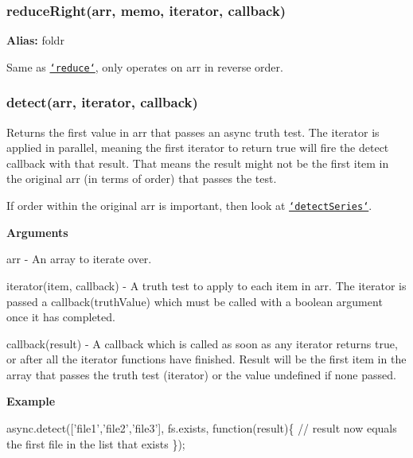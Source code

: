 \label{_reduceRight}%
 \subsubsection*{reduce\+Right(arr, memo, iterator, callback)}

{\bfseries Alias\+:} {\ttfamily foldr}

Same as \href{#reduce}{\tt `reduce`}, only operates on {\ttfamily arr} in reverse order.





\label{_detect}%
 \subsubsection*{detect(arr, iterator, callback)}

Returns the first value in {\ttfamily arr} that passes an async truth test. The {\ttfamily iterator} is applied in parallel, meaning the first iterator to return {\ttfamily true} will fire the detect {\ttfamily callback} with that result. That means the result might not be the first item in the original {\ttfamily arr} (in terms of order) that passes the test.

If order within the original {\ttfamily arr} is important, then look at \href{#detectSeries}{\tt `detect\+Series`}.

{\bfseries Arguments}


\begin{DoxyItemize}
\item {\ttfamily arr} -\/ An array to iterate over.
\item {\ttfamily iterator(item, callback)} -\/ A truth test to apply to each item in {\ttfamily arr}. The iterator is passed a {\ttfamily callback(truth\+Value)} which must be called with a boolean argument once it has completed.
\item {\ttfamily callback(result)} -\/ A callback which is called as soon as any iterator returns {\ttfamily true}, or after all the {\ttfamily iterator} functions have finished. Result will be the first item in the array that passes the truth test (iterator) or the value {\ttfamily undefined} if none passed.
\end{DoxyItemize}

{\bfseries Example}


\begin{DoxyCode}
async.detect([\textcolor{stringliteral}{'file1'},\textcolor{stringliteral}{'file2'},\textcolor{stringliteral}{'file3'}], fs.exists, \textcolor{keyword}{function}(result)\{
    \textcolor{comment}{// result now equals the first file in the list that exists}
\});
\end{DoxyCode}
 



